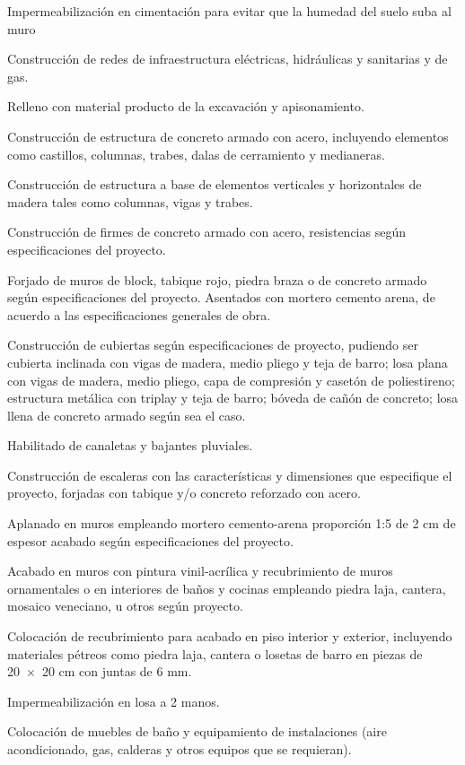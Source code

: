 \documentclass{article}
\begin{document}
Impermeabilización en cimentación para evitar que la humedad del suelo suba al muro

Construcción de redes de infraestructura eléctricas, hidráulicas y sanitarias y de gas.

Relleno con material producto de la excavación y apisonamiento.

Construcción de estructura de concreto armado con acero, incluyendo elementos como castillos, columnas, trabes, dalas de cerramiento y medianeras.

Construcción de estructura a base de elementos verticales y horizontales de madera tales como columnas, vigas y trabes.

Construcción de firmes de concreto armado con acero, resistencias según especificaciones del proyecto.

Forjado de muros de block, tabique rojo, piedra braza o de concreto armado según especificaciones del proyecto. Asentados con mortero cemento arena, de acuerdo a las especificaciones generales de obra. 

Construcción de cubiertas según especificaciones de proyecto, pudiendo ser cubierta inclinada con vigas de madera, medio pliego y teja de barro; losa plana con vigas de madera, medio pliego, capa de compresión y casetón de poliestireno; estructura metálica con triplay y teja de barro; bóveda de cañón de concreto; losa llena de concreto armado según sea el caso. 

Habilitado de canaletas y bajantes pluviales.

Construcción de escaleras con las características y dimensiones que especifique el proyecto, forjadas con tabique y/o concreto reforzado con acero.

Aplanado en muros empleando mortero cemento-arena proporción 1:5 de 2 cm de espesor acabado según especificaciones del proyecto.

Acabado en muros con pintura vinil-acrílica y recubrimiento de muros ornamentales o en interiores de baños y cocinas empleando piedra laja, cantera, mosaico veneciano, u otros según proyecto.

Colocación de recubrimiento para acabado en piso interior y exterior, incluyendo materiales pétreos como piedra laja, cantera o losetas de barro en piezas de 20~×~20 cm con juntas de 6 mm.

Impermeabilización en losa a 2 manos.

Colocación de muebles de baño y equipamiento de instalaciones (aire acondicionado, gas, calderas y otros equipos que se requieran).
\end{document}
